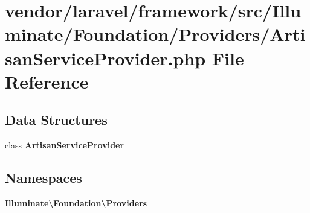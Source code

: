 \section{vendor/laravel/framework/src/\+Illuminate/\+Foundation/\+Providers/\+Artisan\+Service\+Provider.php File Reference}
\label{_artisan_service_provider_8php}
\subsection*{Data Structures}
\begin{DoxyCompactItemize}
\item 
class {\bf Artisan\+Service\+Provider}
\end{DoxyCompactItemize}
\subsection*{Namespaces}
\begin{DoxyCompactItemize}
\item 
 {\bf Illuminate\textbackslash{}\+Foundation\textbackslash{}\+Providers}
\end{DoxyCompactItemize}
